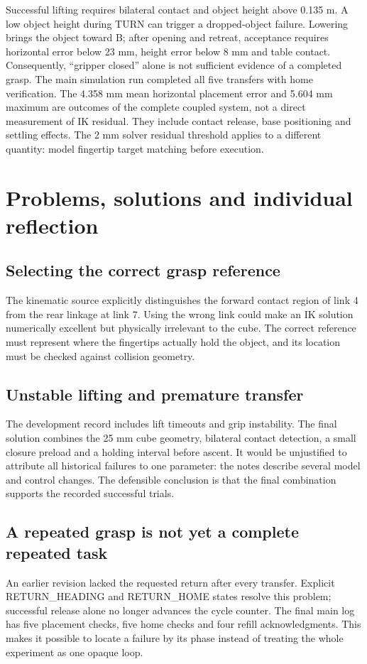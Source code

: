 Successful lifting requires bilateral contact and object height above 0.135 m. A low object height during TURN can trigger a dropped-object failure. Lowering brings the object toward B; after opening and retreat, acceptance requires horizontal error below 23 mm, height error below 8 mm and table contact. Consequently, ``gripper closed'' alone is not sufficient evidence of a completed grasp.
\mainresults
The main simulation run completed all five transfers with home verification. The 4.358 mm mean horizontal placement error and 5.604 mm maximum are outcomes of the complete coupled system, not a direct measurement of IK residual. They include contact release, base positioning and settling effects. The 2 mm solver residual threshold applies to a different quantity: model fingertip target matching before execution.
\hardwareresult
\clearpage
\section{Problems, solutions and individual reflection}
\subsection{Selecting the correct grasp reference}
The kinematic source explicitly distinguishes the forward contact region of link 4 from the rear linkage at link 7. Using the wrong link could make an IK solution numerically excellent but physically irrelevant to the cube. The correct reference must represent where the fingertips actually hold the object, and its location must be checked against collision geometry.
\subsection{Unstable lifting and premature transfer}
The development record includes lift timeouts and grip instability. The final solution combines the 25 mm cube geometry, bilateral contact detection, a small closure preload and a holding interval before ascent. It would be unjustified to attribute all historical failures to one parameter: the notes describe several model and control changes. The defensible conclusion is that the final combination supports the recorded successful trials.
\subsection{A repeated grasp is not yet a complete repeated task}
An earlier revision lacked the requested return after every transfer. Explicit RETURN\_HEADING and RETURN\_HOME states resolve this problem; successful release alone no longer advances the cycle counter. The final main log has five placement checks, five home checks and four refill acknowledgments. This makes it possible to locate a failure by its phase instead of treating the whole experiment as one opaque loop.

